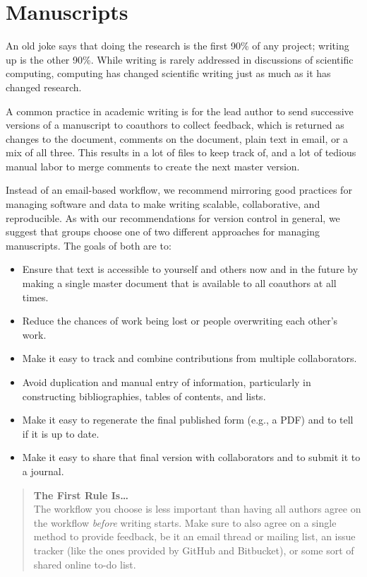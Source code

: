 \documentclass[10pt,letterpaper]{article}
\newcommand{\practicesection}[2]{\section{#1}\label{#2}}
\begin{document}
\practicesection{Manuscripts}{sec:manuscripts}

An old joke says that doing the research is the first 90\% of any
project; writing up is the other 90\%. While writing is rarely
addressed in discussions of scientific computing, computing has
changed scientific writing just as much as it has changed research.

A common practice in academic writing is for the lead author to send
successive versions of a manuscript to coauthors to collect feedback,
which is returned as changes to the document, comments on the
document, plain text in email, or a mix of all three. This results in
a lot of files to keep track of, and a lot of tedious manual labor to
merge comments to create the next master version.

Instead of an email-based workflow, we recommend mirroring good
practices for managing software and data to make writing scalable,
collaborative, and reproducible.  As with our recommendations for
version control in general, we suggest that groups choose one of two
different approaches for managing manuscripts.  The goals of both are
to:

\begin{itemize}

\item
  Ensure that text is accessible to yourself and others now and in the
  future by making a single master document that is available to all
  coauthors at all times.

\item
  Reduce the chances of work being lost or people overwriting each
  other's work.

\item
  Make it easy to track and combine contributions from multiple
  collaborators.

\item
  Avoid duplication and manual entry of information, particularly in
  constructing bibliographies, tables of contents, and lists.

\item
  Make it easy to regenerate the final published form (e.g., a PDF)
  and to tell if it is up to date.

\item
  Make it easy to share that final version with collaborators and to
  submit it to a journal.

\end{itemize}

\begin{quote}
  \noindent \textbf{The First Rule Is{\ldots}}
  \\
  The workflow you choose is less important than having all authors
  agree on the workflow \emph{before} writing starts. Make sure to
  also agree on a single method to provide feedback, be it an email
  thread or mailing list, an issue tracker (like the ones provided by
  GitHub and Bitbucket), or some sort of shared online to-do list.
\end{quote}
\end{document}
